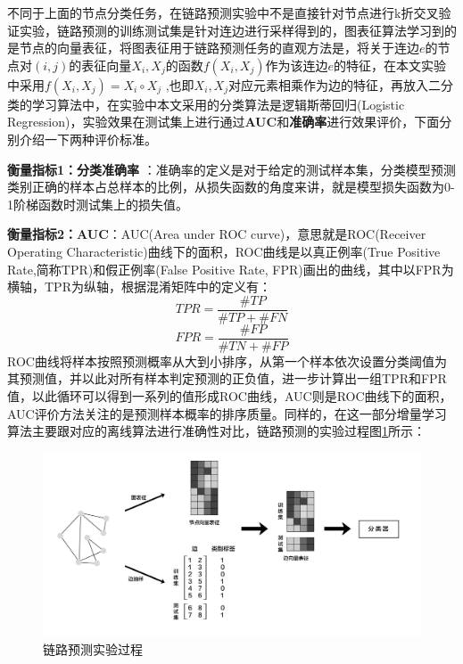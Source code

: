 不同于上面的节点分类任务，在链路预测实验中不是直接针对节点进行k折交叉验证实验，链路预测的训练测试集是针对连边进行采样得到的，图表征算法学习到的是节点的向量表征，将图表征用于链路预测任务的直观方法是，将关于连边$e$的节点对$(i,j)$的表征向量$X_i,X_j$的函数$f(X_i, X_j)$作为该连边$e$的特征，在本文实验中采用$f(X_i, X_j) = X_i\circ X_j$ ,也即$X_i, X_j$对应元素相乘作为边的特征，再放入二分类的学习算法中，在实验中本文采用的分类算法是逻辑斯蒂回归(Logistic Regression)，实验效果在测试集上进行通过\textbf{AUC}和\textbf{准确率}进行效果评价，下面分别介绍一下两种评价标准。

{\textbf{衡量指标1：分类准确率}} ：准确率的定义是对于给定的测试样本集，分类模型预测类别正确的样本占总样本的比例，从损失函数的角度来讲，就是模型损失函数为0-1阶梯函数时测试集上的损失值。

\textbf{衡量指标2：AUC}：AUC(Area under ROC curve)，意思就是ROC(Receiver Operating Characteristic)曲线下的面积，ROC曲线是以真正例率(True Positive Rate,简称TPR)和假正例率(False Positive Rate, FPR)画出的曲线，其中以FPR为横轴，TPR为纵轴，根据混淆矩阵中的定义有：
\begin{equation}
	TPR = \frac{\#TP}{\#TP+\#FN}
\end{equation}
\begin{equation}
FPR = \frac{\#FP}{\#TN+\#FP}
\end{equation}
ROC曲线将样本按照预测概率从大到小排序，从第一个样本依次设置分类阈值为其预测值，并以此对所有样本判定预测的正负值，进一步计算出一组TPR和FPR值，以此循环可以得到一系列的值形成ROC曲线，AUC则是ROC曲线下的面积，AUC评价方法关注的是预测样本概率的排序质量。同样的，在这一部分增量学习算法主要跟对应的离线算法进行准确性对比，链路预测的实验过程图\ref{fig:link_prediction_process}所示：
\begin{figure}
	\centering
	\includegraphics[width=6in]{figures/link_predict_frame}
	\caption{链路预测实验过程}
	\label{fig:link_prediction_process}
\end{figure}

